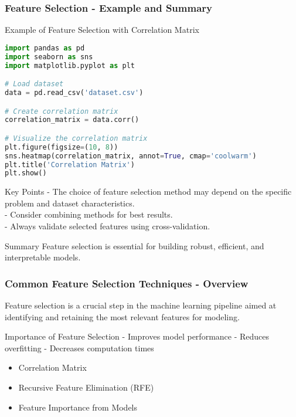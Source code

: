 \documentclass[aspectratio=169]{beamer}
\begin{document}
\begin{frame}[fragile]
    \frametitle{Feature Selection - Example and Summary}
    \begin{block}{Example of Feature Selection with Correlation Matrix}
        \begin{lstlisting}[language=Python]
import pandas as pd
import seaborn as sns
import matplotlib.pyplot as plt

# Load dataset
data = pd.read_csv('dataset.csv')

# Create correlation matrix
correlation_matrix = data.corr()

# Visualize the correlation matrix
plt.figure(figsize=(10, 8))
sns.heatmap(correlation_matrix, annot=True, cmap='coolwarm')
plt.title('Correlation Matrix')
plt.show()
        \end{lstlisting}
    \end{block}
    
    \begin{block}{Key Points}
        - The choice of feature selection method may depend on the specific problem and dataset characteristics. \\
        - Consider combining methods for best results. \\
        - Always validate selected features using cross-validation.
    \end{block}
    
    \begin{block}{Summary}
        Feature selection is essential for building robust, efficient, and interpretable models. 
    \end{block}
\end{frame}

\begin{frame}[fragile]
    \frametitle{Common Feature Selection Techniques - Overview}
    Feature selection is a crucial step in the machine learning pipeline aimed at identifying and retaining the most relevant features for modeling.
    
    \begin{block}{Importance of Feature Selection}
        - Improves model performance
        - Reduces overfitting
        - Decreases computation times
    \end{block}

    \begin{itemize}
        \item Correlation Matrix
        \item Recursive Feature Elimination (RFE)
        \item Feature Importance from Models
    \end{itemize}
\end{frame}
\end{document}
